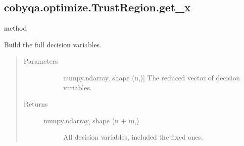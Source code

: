 \documentclass[letterpaper,10pt,english]{sphinxmanual}
\begin{document}
\begin{fulllineitems}
\begin{fulllineitems}
\begin{quote}
\begin{description}
\begin{description}
\end{description}

\end{description}\end{quote}

\end{fulllineitems}



\subsection{cobyqa.optimize.TrustRegion.get\_x}
\label{\detokenize{refs/generated/cobyqa.optimize.TrustRegion.get_x:cobyqa-optimize-trustregion-get-x}}\label{\detokenize{refs/generated/cobyqa.optimize.TrustRegion.get_x::doc}}
\sphinxAtStartPar
method

\begin{fulllineitems}
\label{\detokenize{refs/generated/cobyqa.optimize.TrustRegion.get_x:cobyqa.optimize.TrustRegion.get_x}}
\sphinxAtStartPar
Build the full decision variables.
\begin{quote}\begin{description}
\item[{Parameters}] \leavevmode\begin{description}
\item[{}] \leavevmode{[}numpy.ndarray, shape (n,){]}
\sphinxAtStartPar
The reduced vector of decision variables.

\end{description}

\item[{Returns}] \leavevmode\begin{description}
\item[{numpy.ndarray, shape (n + m,)}] \leavevmode
\sphinxAtStartPar
All decision variables, included the fixed ones.

\end{description}

\end{description}\end{quote}

\end{fulllineitems}




\end{fulllineitems}
\end{document}
